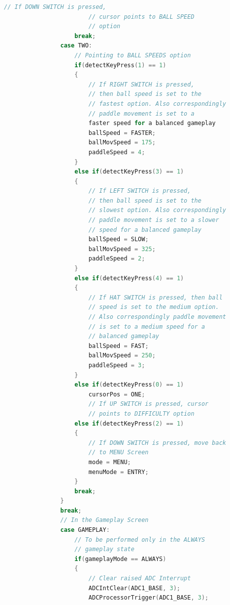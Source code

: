 \documentclass{article}
\begin{document}
\begin{lstlisting}[basicstyle = \small, language = C]
                        // If DOWN SWITCH is pressed, 
                        // cursor points to BALL SPEED
                        // option
                    break;
                case TWO:
                    // Pointing to BALL SPEEDS option
                    if(detectKeyPress(1) == 1)
                    {
                        // If RIGHT SWITCH is pressed, 
                        // then ball speed is set to the 
                        // fastest option. Also correspondingly
                        // paddle movement is set to a 
                        faster speed for a balanced gameplay
                        ballSpeed = FASTER;
                        ballMovSpeed = 175;
                        paddleSpeed = 4;
                    }
                    else if(detectKeyPress(3) == 1)
                    {
                        // If LEFT SWITCH is pressed, 
                        // then ball speed is set to the 
                        // slowest option. Also correspondingly
                        // paddle movement is set to a slower 
                        // speed for a balanced gameplay
                        ballSpeed = SLOW;
                        ballMovSpeed = 325;
                        paddleSpeed = 2;
                    }
                    else if(detectKeyPress(4) == 1)
                    {
                        // If HAT SWITCH is pressed, then ball
                        // speed is set to the medium option. 
                        // Also correspondingly paddle movement 
                        // is set to a medium speed for a 
                        // balanced gameplay
                        ballSpeed = FAST;
                        ballMovSpeed = 250;
                        paddleSpeed = 3;
                    }
                    else if(detectKeyPress(0) == 1)
                        cursorPos = ONE; 
                        // If UP SWITCH is pressed, cursor 
                        // points to DIFFICULTY option
                    else if(detectKeyPress(2) == 1)
                    {
                        // If DOWN SWITCH is pressed, move back 
                        // to MENU Screen
                        mode = MENU;
                        menuMode = ENTRY;
                    }
                    break;
                }
                break;
                // In the Gameplay Screen
                case GAMEPLAY:
                    // To be performed only in the ALWAYS 
                    // gameplay state
                    if(gameplayMode == ALWAYS)
                    {
                        // Clear raised ADC Interrupt
                        ADCIntClear(ADC1_BASE, 3);
                        ADCProcessorTrigger(ADC1_BASE, 3);


\end{lstlisting}
\end{document}
